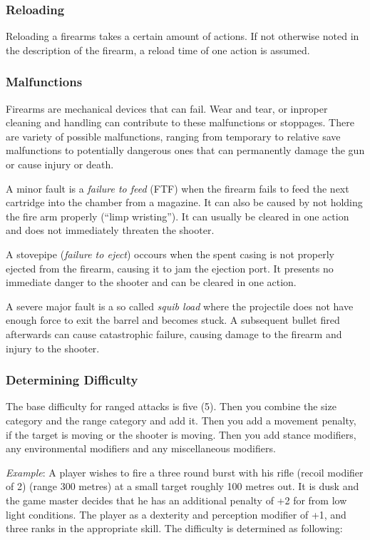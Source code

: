 \subsubsection{Reloading}

Reloading a firearms takes a certain amount of actions. If not otherwise noted
in the description of the firearm, a reload time of one action is assumed.

\subsubsection{Malfunctions}

Firearms are mechanical devices that can fail. Wear and tear, or inproper
cleaning and handling can contribute to these malfunctions or stoppages. There
are variety of possible malfunctions, ranging from temporary to relative save
malfunctions to potentially dangerous ones that can permanently damage the gun
or cause injury or death.

A minor fault is a \emph{failure to feed} (FTF) when the firearm fails to feed
the next cartridge into the chamber from a magazine. It can also be caused by
not holding the fire arm properly (``limp wristing''). It can usually be cleared
in one action and does not immediately threaten the shooter.

A stovepipe (\emph{failure to eject}) occours when the spent casing is not
properly ejected from the firearm, causing it to jam the ejection port. It
presents no immediate danger to the shooter and can be cleared in one action.

A severe major fault is a so called \emph{squib load} where the projectile does
not have enough force to exit the barrel and becomes stuck. A subsequent bullet
fired afterwards can cause catastrophic failure, causing damage to the firearm
and injury to the shooter.

\subsubsection{Determining Difficulty}

The base difficulty for ranged attacks is five (5). Then you combine the size
category and the range category and add it. Then you add a movement penalty,
if the target is moving or the shooter is moving. Then you add stance modifiers,
any environmental modifiers and any miscellaneous modifiers.

\emph{Example}: A player wishes to fire a three round burst with his rifle
(recoil modifier of 2) (range 300 metres) at a small target roughly 100 metres
out. It is dusk and the game master decides that he has an additional penalty
of +2 for from low light conditions. The player as a dexterity and perception
modifier of +1, and three ranks in the appropriate skill. The difficulty is
determined as following:


